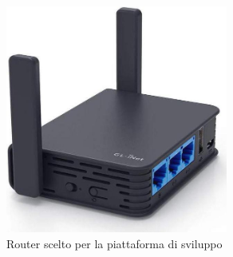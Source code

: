 \begin{figure}[h]
  \centering
  \includegraphics[width=0.65\textwidth]{figures/router.jpg}
  \caption{Router scelto per la piattaforma di sviluppo}
  \label{router}
\end{figure}
